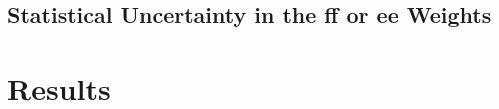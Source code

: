 \documentclass[dissertation.tex]{subfiles}
\begin{document}
\subsection{Statistical Uncertainty in the ff or ee Weights}
\label{sec:Statistical Uncertainty in the ff or ee Weights}

\section{Results}
\label{sec:Results}

\end{document}
